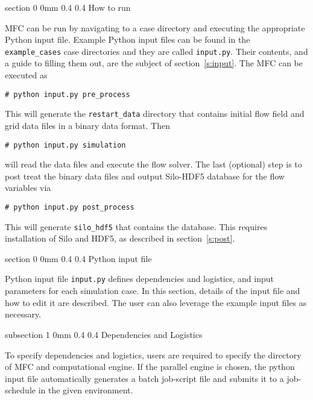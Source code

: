 \documentclass[11pt]{article}
\makeatletter
\renewcommand{\section}{\@startsection
{section}%
{0}%
{0mm}%
{0.4\baselineskip}%
{0.4\baselineskip}%
{\normalfont\Large\bfseries\color{myBrown}}}%
\renewcommand{\subsection}{\@startsection
{subsection}%
{1}%
{0mm}%
{0.4\baselineskip}%
{0.4\baselineskip}%
{\normalfont\large\bfseries\color{myBrown}}}%
\makeatother
\begin{document}
\section{How to run}\label{s:run}

MFC can be run by navigating to a case directory and executing the appropriate Python input file.
Example Python input files can be found in the \texttt{example\_cases} case directories and they are called \texttt{input.py}.
Their contents, and a guide to filling them out, are the subject of section~\ref{s:input}.
The MFC can be executed as
\begin{lstlisting}[style=BashInputStyle]
	# python input.py pre_process
\end{lstlisting}
This will generate the \texttt{restart_data} directory that contains initial flow field and grid data files in a binary data format.
Then
\begin{lstlisting}[style=BashInputStyle]
	# python input.py simulation
\end{lstlisting}
will read the data files and execute the flow solver. 
The last (optional) step is to post treat the binary data files and output Silo-HDF5 database for the flow variables via
\begin{lstlisting}[style=BashInputStyle]
	# python input.py post_process
\end{lstlisting}
This will generate \texttt{silo_hdf5} that contains the database.
This requires installation of Silo and HDF5, as described in section~\ref{s:post}.

\section{Python input file}\label{s:input}

Python input file \texttt{input.py} defines dependencies and logistics, and input parameters for each simulation case.
In this section, details of the input file and how to edit it are described.
The user can also leverage the example input files as necessary.

\subsection{Dependencies and Logistics}

To specify dependencies and logistics, users are required to specify the directory of MFC and computational engine.
If the parallel engine is chosen, the python input file automatically generates a batch job-script file and submits it to a job-schedule in the given environment.
\end{document}
